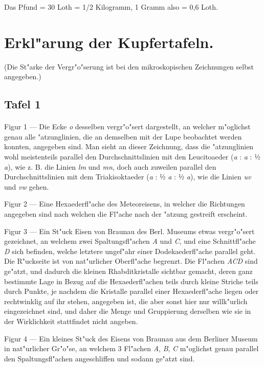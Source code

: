 \documentclass[a4paper, 11pt, oneside, german]{article}
\begin{document}
\begin{center}
Das Pfund = 30 Loth = 1/2 Kilogramm, 1 Gramm also = 0,6 Loth.
\end{center}
\clearpage
\section{Erkl"arung der Kupfertafeln.}
\begin{center}
(Die St"arke der Vergr"o"serung ist bei den mikroskopischen Zeichnungen selbst angegeben.)
\end{center}
\subsection{Tafel 1}
\paragraph{}
Figur 1 --- Die Ecke \emph{o} desselben vergr"o"sert dargestellt, an welcher m"oglichst genau alle "atzunglinien, die an demselben mit der Lupe beobachtet werden konnten, angegeben sind. Man sieht an dieser Zeichnung, dass die "atzunglinien wohl meistenteils parallel den Durchschnittslinien mit den Leucitoaeder (\emph{a} : \emph{a} : ½ \emph{a}), wie z. B. die Linien \emph{lm} und \emph{mn}, doch auch zuweilen parallel den Durchschnittslinien mit dem Triakisoktaeder (\emph{a} : ½ \emph{a} : ½ \emph{a}), wie die Linien \emph{uv} und \emph{vw} gehen.

Figur 2 --- Eine Hexaederfl"ache des Meteoreisens, in welcher die Richtungen angegeben sind nach welchen die Fl"ache nach der "atzung gestreift erscheint.

Figur 3 --- Ein St"uck Eisen von Braunau des Berl. Museums etwas vergr"o"sert gezeichnet, an welchem zwei Spaltungsfl"achen \emph{A} und \emph{C}, und eine Schnittfl"ache \emph{D} sich befinden, welche letztere ungef"ahr einer Dodekaederfl"ache parallel geht. Die R"uckseite ist von nat"urlicher Oberfl"ache begrenzt. Die Fl"achen \emph{ACD} sind ge"atzt, und dadurch die kleinen Rhabditkristalle sichtbar gemacht, deren ganz bestimmte Lage in Bezug auf die Hexaederfl"achen teils durch kleine Striche teils durch Punkte, je nachdem die Kristalle parallel einer Hexaederfl"ache liegen oder rechtwinklig auf ihr stehen, angegeben ist, die aber sonst hier nur willk"urlich eingezeichnet sind, und daher die Menge und Gruppierung derselben wie sie in der Wirklichkeit stattfindet nicht angeben.

Figur 4 --- Ein kleines St"uck des Eisens von Braunau aus dem Berliner Museum in nat"urlicher Gr"o"se, an welchem 3 Fl"achen \emph{A}, \emph{B}, \emph{C} m"oglichst genau parallel den Spaltungsfl"achen angeschliffen und sodann ge"atzt sind.
\end{document}
